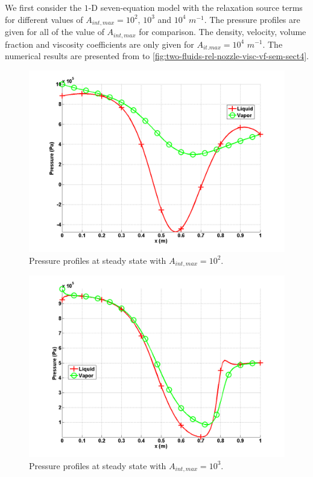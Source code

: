 We first consider the $1$-D seven-equation model with the relaxation source terms for different values of $A_{int,max} = 10^2 \text{, } 10^3$ and $10^4$ $m^{-1}$. The pressure profiles are given for all of the value of $A_{int,max}$ for comparison. The density, velocity, volume fraction and viscosity coefficients are only given for $A_{it.max} = 10^4$ $m^{-1}$. The numerical results are presented from  to \ref{fig:two-fluids-rel-nozzle-visc-vf-sem-sect4}.
%
\begin{figure}[H]
\centering
\includegraphics[width=\textwidth]{figures/SEM/Aint1e2_two_phases_pressure.png}
\caption{Pressure profiles at steady state with $A_{int,max} = 10^2$.}
\label{fig:two-fluids-rel-nozzle-press-Aint2-sem-sect4}
\end{figure}
%
\begin{figure}[H]
\centering
\includegraphics[width=\textwidth]{figures/SEM/Aint1e3_two_phases_pressure.png}
\caption{Pressure profiles at steady state with $A_{int,max} = 10^3$.}
\label{fig:two-fluids-rel-nozzle-press-Aint3-sem-sect4}
\end{figure}
